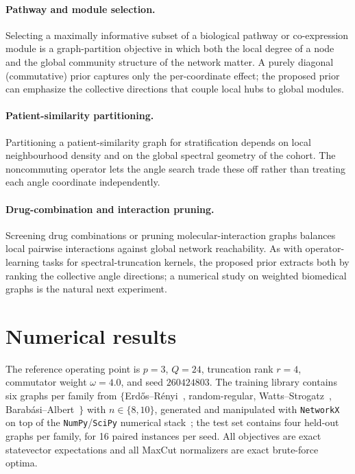 \documentclass[aps,prxquantum,reprint,amsmath,amssymb,floatfix,nofootinbib,superscriptaddress,longbibliography]{revtex4-2}
\theoremstyle{remark}
\begin{document}
\paragraph{Pathway and module selection.}
Selecting a maximally informative subset of a biological pathway or co-expression
module is a graph-partition objective in which both the local degree of a node and
the global community structure of the network matter.  A purely diagonal
(commutative) prior captures only the per-coordinate effect; the proposed prior
can emphasize the collective directions that couple local hubs to global modules.

\paragraph{Patient-similarity partitioning.}
Partitioning a patient-similarity graph for stratification depends on local
neighbourhood density and on the global spectral geometry of the cohort.  The
noncommuting operator lets the angle search trade these off rather than treating
each angle coordinate independently.

\paragraph{Drug-combination and interaction pruning.}
Screening drug combinations or pruning molecular-interaction graphs balances
local pairwise interactions against global network reachability.  As with
operator-learning tasks for spectral-truncation kernels, the proposed prior
extracts both by ranking the collective angle directions; a numerical study on
weighted biomedical graphs is the natural next experiment.

\section{Numerical results}
\label{sec:numerical}

The reference operating point is \(p=3\), \(Q=24\), truncation rank \(r=4\),
commutator weight \(\omega=4.0\), and seed \(260424803\).  The training library
contains six graphs per family from
\(\{\)Erd\H{o}s--R\'enyi~\cite{erdos1959}, random-regular,
Watts--Strogatz~\cite{watts1998},
Barab\'asi--Albert~\cite{barabasi1999}\(\}\) with \(n\in\{8,10\}\), generated and
manipulated with \texttt{NetworkX}~\cite{hagberg2008} on top of the
\texttt{NumPy}/\texttt{SciPy} numerical
stack~\cite{harris2020,virtanen2020}; the test set contains four
held-out graphs per family, for 16 paired instances per seed.  All objectives are
exact statevector expectations and all MaxCut normalizers are exact brute-force
optima.
\end{document}
